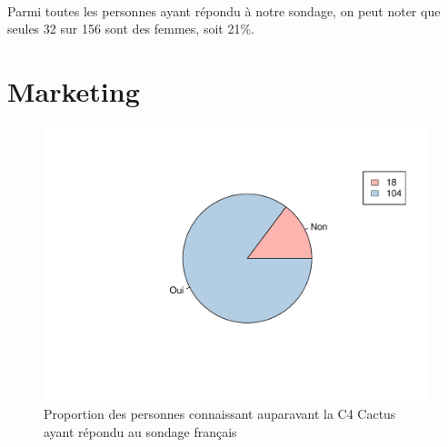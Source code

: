 \documentclass[12pt]{article}\usepackage[]{graphicx}\usepackage[]{color}
\makeatletter
\def\maxwidth{ %
  \ifdim\Gin@nat@width>\linewidth
    \linewidth
  \else
    \Gin@nat@width
  \fi
}
\newenvironment{knitrout}{}{} %
\makeatother
\begin{document}
\paragraph{} Parmi toutes les personnes ayant répondu à notre sondage, on peut noter
que seules 32 sur 156 sont des femmes, soit 21\%.

\break
\section{Marketing}

\begin{knitrout}
\color{fgcolor}\begin{figure}[H]
\includegraphics[width=\maxwidth]{figure/know_fr-1} \caption[Proportion des personnes connaissant auparavant la C4 Cactus ayant répondu au sondage français]{Proportion des personnes connaissant auparavant la C4 Cactus ayant répondu au sondage français}\label{fig:know fr}
\end{figure}


\end{knitrout}

%
%
\end{document}
